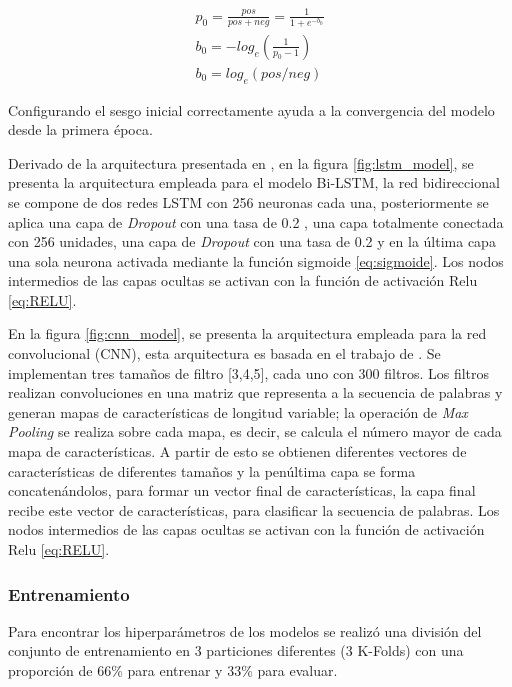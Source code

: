 \begin{equation}
\label{eq:bias}
\begin{split}
    p_0= \frac{pos}{pos+neg}= \frac{1}{1+e^{-b_0}}\\
    b_0=-log_e(\frac{1}{p_0-1})\\
    b_0=log_e(pos/neg)
\end{split}
\end{equation}

Configurando el sesgo inicial correctamente ayuda a la convergencia del modelo desde la primera época.

Derivado de la arquitectura presentada en  \citep{adhikari2019rethinking}, en la figura  \ref{fig:lstm_model}, se presenta la arquitectura empleada para el modelo Bi-LSTM, la red bidireccional se compone de dos redes LSTM con 256 neuronas cada una, posteriormente se aplica una capa de \textit{Dropout} con una tasa de 0.2 , una capa totalmente conectada con 256 unidades, una capa de \textit{Dropout} con una tasa de 0.2 y en la última capa una sola neurona activada mediante la función sigmoide \ref{eq:sigmoide}. Los nodos intermedios de las capas ocultas se activan con la función de activación Relu \ref{eq:RELU}. 


En la figura \ref{fig:cnn_model}, se presenta la arquitectura empleada para la red convolucional (CNN), esta arquitectura es basada en el trabajo de \citep{kim2014convolutional}. Se implementan tres tamaños de filtro [3,4,5], cada uno con 300 filtros. Los filtros realizan convoluciones en una matriz que representa a la secuencia de palabras y generan mapas de características de longitud variable; la operación de \textit{Max Pooling }se realiza sobre cada mapa, es decir, se calcula el número mayor de cada mapa de características. A partir de esto se obtienen diferentes vectores de características de diferentes tamaños y la penúltima capa se forma concatenándolos, para formar un vector final de características, la capa final recibe este vector de características, para clasificar la secuencia de palabras. Los nodos intermedios de las capas ocultas se activan con la función de activación Relu \ref{eq:RELU}. 



\subsubsection{Entrenamiento}
Para encontrar los hiperparámetros de los modelos se realizó una división del conjunto de entrenamiento en 3 particiones diferentes (3 K-Folds) con una proporción de 66\% para entrenar y 33\% para evaluar.



